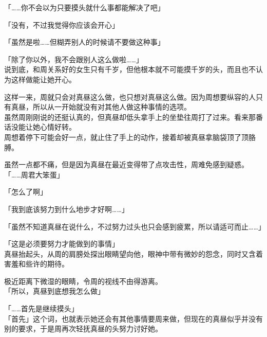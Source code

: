 「……你不会以为只要摸头就什么事都能解决了吧」

「没有，不过我觉得你应该会开心」

「虽然是啦……但糊弄别人的时候请不要做这种事」

「除了你以外，我不会跟别人这么做啦……」\\

说到底，和周关系好的女生只有千岁，但他根本就不可能摸千岁的头，而且也不认为这样做能让她开心。

这样一来，周就只会对真昼这么做，也只想对真昼这么做。因为周想要纵容的人只有真昼，所以从一开始就没有对其他人做这种事情的选项。\\

虽然周刚刚说的还挺认真的，但真昼却低头拿手上的坐垫往周打了过来。看来那番话没能让她心情好转。\\

周想着停下可能会好一点，就止住了手上的动作，接着却被真昼拿脑袋顶了顶胳膊。

虽然一点都不痛，但是因为真昼在最近变得带了点攻击性，周难免感到疑惑。\\

「……周君大笨蛋」

「怎么了啊」

「我到底该努力到什么地步才好啊……」

「虽然不知道真昼在说什么，不过努力过头也只会感到疲累，所以请适可而止……」

「这是必须要努力才能做到的事情」\\

真昼抬起头，从周的肩膀处探出眼睛望向他，眼神中带有微妙的怨念，同时又含着害羞和些许的期待。

极近距离下微湿的眼睛，令周的视线不由得游离。\\

「所以，真昼到底想我怎么做」

「……首先是继续摸头」\\

「首先」这个词，也就表示她还会有其他事情要周来做，但现在的真昼似乎并没有别的要求，于是周再次轻抚真昼的头努力讨好她。
